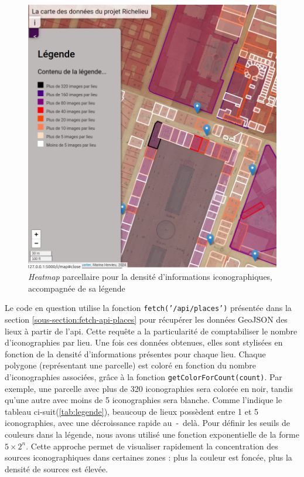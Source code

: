 \begin{figure}[h!]
    \centering
    \includegraphics[width=0.75\linewidth]{images/heat-map-density.png}
    \caption{\textit{Heatmap} parcellaire pour la densité d'informations iconographiques, accompagnée de sa légende}
    \label{fig:heat-map}
\end{figure}

Le code en question utilise la fonction \texttt{fetch('/api/places')} présentée dans la section \ref{sous-section:fetch-api-places} pour récupérer les données GeoJSON des lieux à partir de l'\acrshort{api}. Cette requête a la particularité de comptabiliser le nombre d'iconographies par lieu. Une fois ces données obtenues, elles sont stylisées en fonction de la densité d'informations présentes pour chaque lieu. Chaque polygone (représentant une parcelle) est coloré en fonction du nombre d'iconographies associées, grâce à la fonction \texttt{getColorForCount(count)}. Par exemple, une parcelle avec plus de 320 iconographies sera colorée en noir, tandis qu'une autre avec moins de 5 iconographies sera blanche. Comme l'indique le tableau ci-suit(\ref{tab:legende}), beaucoup  de lieux possèdent entre 1 et 5 iconographies, avec une décroissance rapide au~-~delà. Pour définir les seuils de couleurs dans la légende, nous avons utilisé une fonction exponentielle de la forme $5 \times 2^n$. Cette approche permet de visualiser rapidement la concentration des sources iconographiques dans certaines zones : plus la couleur est foncée, plus la densité de sources est élevée.

